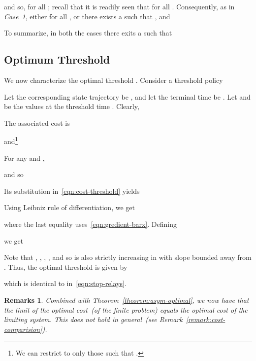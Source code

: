 \documentclass[10pt,journal,letterpaper]{IEEEtran}
\newtheorem{remarks}{Remarks}[section]
\newcommand{\remove}[1]{}
\begin{document}
\begin{IEEEproof}
and so,  for all ; 
recall that it is readily seen that   for all .  
Consequently, as in {\it Case~1},
either  for all , 
or there exists a  such that , and 


\remove{
 for all . Our assertion
for conclusion implies that~(see~\eqref{adjoint2})

and so,  is increasing in . Since
, either there exists a  such that  and

or  for all . In the former case,


for all  , further implying that  for all
. In the latter case, . We also have  and .
But this is similar to {\it Case~1}, whence we conclude that either
 for all , or there exists a  such that

}

To summarize, in both the cases there exits a  such that


\subsection{Optimum Threshold}
We now characterize the optimal threshold . Consider a threshold policy

Let the corresponding state trajectory be
, and let the terminal
time be . Let  and
 be the values at the threshold
time . Clearly,

The associated cost is

and\footnote{We can restrict to only those  such that .}

For any  and ,

and so

Its substitution in~\eqref{eqn:cost-threshold} yields

Using Leibniz rule of differentiation, we get

where the last equality uses~\eqref{eqn:gredient-barx}. Defining

we get

Note that , ,
, , 
and so  is also strictly increasing in  with slope bounded away from .
Thus, the optimal threshold is given by

which is identical to  in~\eqref{eqn:stop-relays}.
\end{IEEEproof}
\begin{remarks}
Combined with Theorem~\ref{theorem:asym-optimal}, we now have that the limit of the optimal cost~(of the finite problem) equals the
optimal cost of the limiting system. This does not hold in general~(see Remark~\ref{remark:cost-comparision}).
\end{remarks}



\end{document}
